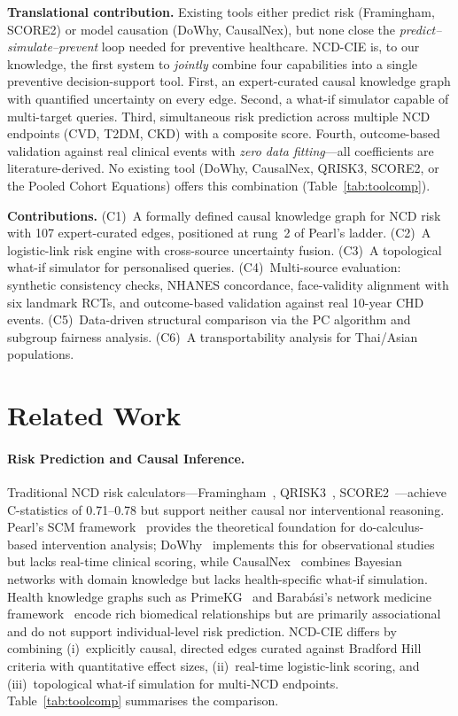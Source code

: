 \documentclass[runningheads]{llncs}
\begin{document}
\noindent\textbf{Translational contribution.}
Existing tools either predict risk (Framingham, SCORE2) or model
causation (DoWhy, CausalNex), but none close the
\emph{predict--simulate--prevent} loop needed for preventive healthcare.
NCD-CIE is, to our knowledge, the first system to \emph{jointly}
combine four capabilities into a single preventive decision-support
tool.
First, an expert-curated causal knowledge graph with quantified
uncertainty on every edge.
Second, a what-if simulator capable of multi-target
queries.
Third, simultaneous risk prediction across multiple NCD endpoints
(CVD, T2DM, CKD) with a composite score.
Fourth, outcome-based validation against real clinical events with
\emph{zero data fitting}---all coefficients are literature-derived.
No existing tool (DoWhy, CausalNex, QRISK3, SCORE2, or the Pooled
Cohort Equations) offers this combination (Table~\ref{tab:toolcomp}).

\noindent\textbf{Contributions.}
(C1)~A formally defined causal knowledge graph for NCD risk with 107
expert-curated edges, positioned at rung~2 of Pearl's ladder.
(C2)~A logistic-link risk engine with cross-source uncertainty fusion.
(C3)~A topological what-if simulator for personalised queries.
(C4)~Multi-source evaluation: synthetic consistency checks, NHANES
concordance, face-validity alignment with six landmark RCTs,
and outcome-based validation against real 10-year CHD events.
(C5)~Data-driven structural comparison via the PC algorithm and
subgroup fairness analysis.
(C6)~A transportability analysis for Thai/Asian populations.

\section{Related Work}\label{sec:related}

\paragraph{Risk Prediction and Causal Inference.}
Traditional NCD risk calculators---Framingham~\cite{dagostino2008},
QRISK3~\cite{hippisley2017qrisk3}, SCORE2~\cite{score22021}---achieve
C-statistics of 0.71--0.78 but support neither causal nor
interventional reasoning.
Pearl's SCM framework~\cite{pearl2009causality} provides the
theoretical foundation for do-calculus-based intervention analysis;
DoWhy~\cite{sharma2020dowhy} implements this for observational studies
but lacks real-time clinical scoring, while
CausalNex~\cite{beaumont2021causalnex} combines Bayesian networks
with domain knowledge but lacks health-specific what-if simulation.
Health knowledge graphs such as
PrimeKG~\cite{chandak2023primekg} and Barab\'{a}si's network
medicine framework~\cite{barabasi2011network} encode rich biomedical
relationships but are primarily associational and do not support
individual-level risk prediction.
NCD-CIE differs by combining (i)~explicitly causal, directed edges
curated against Bradford Hill criteria with quantitative effect sizes,
(ii)~real-time logistic-link scoring, and (iii)~topological what-if
simulation for multi-NCD endpoints.
Table~\ref{tab:toolcomp} summarises the comparison.
\end{document}
